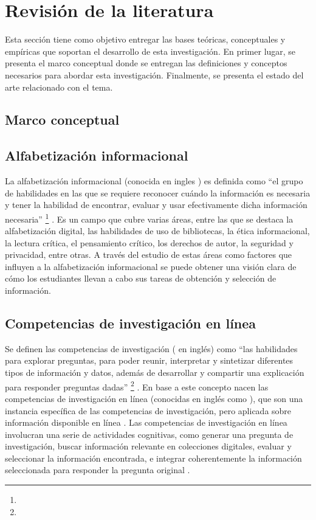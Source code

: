 \section{Revisión de la literatura}
\label{sec:revision-literatura}
Esta sección tiene como objetivo entregar las bases teóricas, conceptuales y empíricas que soportan el desarrollo de esta investigación. En primer lugar, se presenta el marco conceptual donde se entregan las definiciones y conceptos necesarios para abordar esta investigación. Finalmente, se presenta el estado del arte relacionado con el tema.

\subsection{Marco conceptual}

\subsection*{Alfabetización informacional}
La alfabetización informacional (conocida en ingles ) es definida como “el grupo de habilidades en las que se requiere reconocer cuándo la información es necesaria y tener la habilidad de encontrar, evaluar y usar efectivamente dicha información necesaria” \footnote{\traduccionlibre} \parencite[p.~2]{american2000information}. Es un campo que cubre varias áreas, entre las que se destaca la alfabetización digital, las habilidades de uso de bibliotecas, la ética informacional, la lectura crítica, el pensamiento crítico, los derechos de autor, la seguridad y privacidad, entre otras. A través del estudio de estas áreas como factores que influyen a la alfabetización informacional se puede obtener una visión clara de cómo los estudiantes llevan a cabo sus tareas de obtención y selección de información.

\subsection*{Competencias de investigación en línea}
Se definen las competencias de investigación ( en inglés) como “las habilidades para explorar preguntas, para poder reunir, interpretar y sintetizar diferentes tipos de información y datos, además de desarrollar y compartir una explicación para responder preguntas dadas” \footnote{\traduccionlibre} \parencite[p.~13]{national2000inquiry}. En base a este concepto nacen las competencias de investigación en línea (conocidas en inglés como ), que son una instancia específica de las competencias de investigación, pero aplicada sobre información disponible en línea \parencite{quintana2005framework}. Las competencias de investigación en línea involucran una serie de actividades cognitivas, como generar una pregunta de investigación, buscar información relevante en colecciones digitales, evaluar y seleccionar la información encontrada, e integrar coherentemente la información seleccionada para responder la pregunta original \parencite{eisenberg1990information}.

